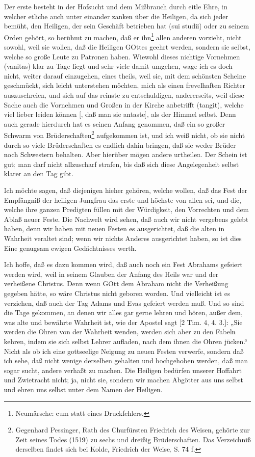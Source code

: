Der erste besteht in der Hofsucht und dem Mißbrauch durch eitle Ehre, in welcher etliche auch unter einander zanken über die Heiligen, da sich jeder bemüht, den Heiligen, der sein Geschäft betrieben hat (sui studii) oder zu seinem Orden gehört, so berühmt zu machen, daß er ihn\footnote{Neumärsche: cum statt eines Druckfehlers.} allen anderen vorzieht, nicht sowohl, weil sie wollen, daß die Heiligen GOttes geehrt werden, sondern sie selbst, welche so große Leute zu Patronen haben. Wiewohl dieses nichtige Vornehmen (vanitas) klar zu Tage liegt und sehr viele damit umgehen, wage ich es doch nicht, weiter darauf einzugehen, eines theils, weil sie, mit dem schönsten Scheine geschmückt, sich leicht unterstehen möchten, mich als einen frevelhaften Richter auszuschreien, und sich auf das reinste zu entschuldigen, andererseits, weil diese Sache auch die Vornehmen und Großen in der Kirche anbetrifft (tangit), welche viel lieber leiden können [, daß man sie antaste], als der Himmel selbst. Denn auch gerade hierdurch hat es seinen Anfang genommen, daß ein so großer Schwarm von Brüderschaften\footnote{Gegenhard Pessinger, Rath des Churfürsten Friedrich des Weisen, gehörte zur Zeit seines Todes (1519) zu sechs und dreißig Brüderschaften. Das Verzeichniß derselben findet sich bei Kolde, Friedrich der Weise, S. 74 f.} aufgekommen ist, und ich weiß nicht, ob sie nicht durch so viele Brüderschaften es endlich dahin bringen, daß sie weder Brüder noch Schwestern behalten. Aber hierüber mögen andere urtheilen. Der Schein ist gut; man darf nicht allzuscharf strafen, bis daß sich diese Angelegenheit selbst klarer an den Tag gibt.

Ich möchte sagen, daß diejenigen hieher gehören, welche wollen, daß das Fest der Empfängniß der heiligen Jungfrau das erste und höchste von allen sei, und die, welche ihre ganzen Predigten füllen mit der Würdigkeit, den Vorrechten und dem Ablaß neuer Feste. Die Nachwelt wird sehen, daß auch wir nicht vergebens gelebt haben, denn wir haben mit neuen Festen es ausgerichtet, daß die alten in Wahrheit veraltet sind; wenn wir nichts Anderes ausgerichtet haben, so ist dies Eine genugsam ewigen Gedächtnisses werth.

Ich hoffe, daß es dazu kommen wird, daß auch noch ein Fest Abrahams gefeiert werden wird, weil in seinem Glauben der Anfang des Heils war und der verheißene Christus. Denn wenn GOtt dem Abraham nicht die Verheißung gegeben hätte, so wäre Christus nicht geboren worden. Und vielleicht ist es verziehen, daß auch der Tag Adams und Evas gefeiert werden muß. Und so sind die Tage gekommen, an denen wir alles gar gerne lehren und hören, außer dem, was alte und bewährte Wahrheit ist, wie der Apostel sagt [2 Tim. 4, 4. 3.]: „Sie werden die Ohren von der Wahrheit wenden, werden sich aber zu den Fabeln kehren, indem sie sich selbst Lehrer aufladen, nach dem ihnen die Ohren jücken.“ Nicht als ob ich eine gottseelige Neigung zu neuen Festen verwerfe, sondern daß ich sehe, daß nicht wenige derselben gehalten und hochgehoben werden, daß man sogar sucht, andere verhaßt zu machen. Die Heiligen bedürfen unserer Hoffahrt und Zwietracht nicht; ja, nicht sie, sondern wir machen Abgötter aus uns selbst und ehren uns selbst unter dem Namen der Heiligen.

